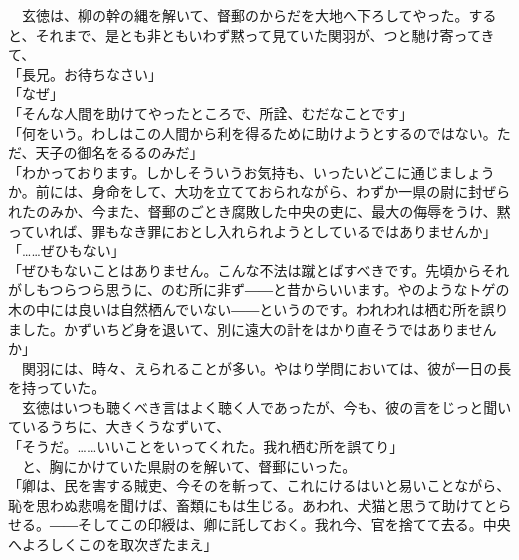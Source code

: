 \documentclass[
  paper=a5,
  fontsize=10pt,
  jafontsize=9.5pt,
  tate,                  %
  open_bracket_pos=nibu, %
]{jlreq}
\begin{document}
　玄徳は、柳の幹の縄を解いて、督郵のからだを大地へ下ろしてやった。すると、それまで、是とも非ともいわず黙って見ていた関羽が、つと馳け寄ってきて、\\


「長兄。お待ちなさい」\\


「なぜ」\\


「そんな人間を助けてやったところで、所詮、むだなことです」\\


「何をいう。わしはこの人間から利を得るために助けようとするのではない。ただ、天子の御名をるるのみだ」\\


「わかっております。しかしそういうお気持も、いったいどこに通じましょうか。前には、身命をして、大功を立てておられながら、わずか一県の尉に封ぜられたのみか、今また、督郵のごとき腐敗した中央の吏に、最大の侮辱をうけ、黙っていれば、罪もなき罪におとし入れられようとしているではありませんか」\\


「……ぜひもない」\\


「ぜひもないことはありません。こんな不法は蹴とばすべきです。先頃からそれがしもつらつら思うに、のむ所に非ず――と昔からいいます。やのようなトゲの木の中には良いは自然栖んでいない――というのです。われわれは栖む所を誤りました。かずいちど身を退いて、別に遠大の計をはかり直そうではありませんか」\\


　関羽には、時々、えられることが多い。やはり学問においては、彼が一日の長を持っていた。\\


　玄徳はいつも聴くべき言はよく聴く人であったが、今も、彼の言をじっと聞いているうちに、大きくうなずいて、\\


「そうだ。……いいことをいってくれた。我れ栖む所を誤てり」\\


　と、胸にかけていた県尉のを解いて、督郵にいった。\\


「卿は、民を害する賊吏、今そのを斬って、これにけるはいと易いことながら、恥を思わぬ悲鳴を聞けば、畜類にもは生じる。あわれ、犬猫と思うて助けてとらせる。――そしてこの印綬は、卿に託しておく。我れ今、官を捨てて去る。中央へよろしくこのを取次ぎたまえ」\\
\end{document}
